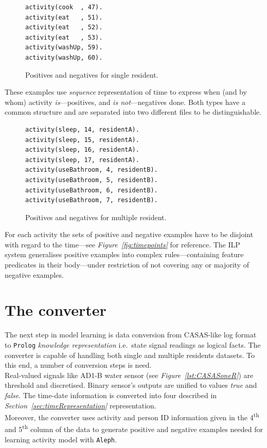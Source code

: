 \documentclass[10pt, a4paper, pdflatex, leqno, twoside, openright]{report}
\newcommand{\ts}{\textsuperscript}
\begin{document}
\begin{figure}[htb] %
  \begin{verbatim}
activity(cook  , 47).
activity(eat   , 51).
activity(eat   , 52).
activity(eat   , 53).
activity(washUp, 59).
activity(washUp, 60).
  \end{verbatim}
  \caption{Positives and negatives for single resident.\label{lst:singleposneg}}
\end{figure}

These examples use \emph{sequence} representation of time to express when (and by whom) activity \emph{is}---positives, and \emph{is not}---negatives done. Both types have a common structure and are separated into two different files to be distinguishable.\\

\begin{figure}[htb] %
  \begin{verbatim}
activity(sleep, 14, residentA).
activity(sleep, 15, residentA).
activity(sleep, 16, residentA).
activity(sleep, 17, residentA).
activity(useBathroom, 4, residentB).
activity(useBathroom, 5, residentB).
activity(useBathroom, 6, residentB).
activity(useBathroom, 7, residentB).
  \end{verbatim}
  \caption{Positives and negatives for multiple resident.\label{lst:multiposneg}}
\end{figure}

For each activity the sets of positive and negative examples have to be disjoint with regard to the time---see \emph{Figure~\ref{fig:timepoints}} for reference. The ILP system generalises positive examples into complex rules---containing feature predicates in their body---under restriction of not covering any or majority of negative examples.

  \section{The converter}
The next step in model learning is data conversion from CASAS-like log format to \texttt{Prolog} \emph{knowledge representation} i.e.\ state signal readings as logical facts. The converter is capable of handling both single and multiple residents datasets. To this end, a number of conversion steps is need.\\

Real-valued signals like AD1-B water sensor (see \emph{Figure~\ref{lst:CASASoneR}}) are threshold and discretised. Binary sensor's outputs are unified to values \emph{true} and \emph{false}. The time-date information is converted into four described in \emph{Section~\ref{sec:timeRepresentation}} representation.\\
Moreover, the converter uses activity and person ID information given in the 4\ts{th} and 5\ts{th} column of the data to generate positive and negative examples needed for learning activity model with \texttt{Aleph}.
\end{document}
